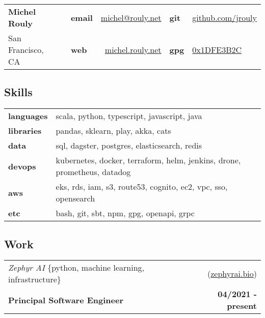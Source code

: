 \documentclass[10pt,letterpaper]{article}
\begin{document}
\setcounter{secnumdepth}{0}

\noindent
\begin{tabularx}{\textwidth}{@{} l X lr lX @{}}
  {\Large\textbf{Michel Rouly}} & &
      \textbf{email} & \href{mailto:michel@rouly.net}{michel@rouly.net} &
      \textbf{git} & \href{https://github.com/jrouly}{github.com/jrouly} \\
  {San Francisco, CA} & &
      \textbf{web} & \href{https://michel.rouly.net}{michel.rouly.net} &
      \textbf{gpg} & \href{https://keyserver.ubuntu.com/pks/lookup?search=0x1DFE3B2C\&fingerprint=on\&op=index}{0x1DFE3B2C} \\
\end{tabularx}

\subsection{Skills}

\noindent
\begin{tabularx}{\textwidth}{@{} lX @{}}
  \textbf{languages} & scala, python, typescript, javascript, java \\
  \textbf{libraries} & pandas, sklearn, play, akka, cats \\
  \textbf{data} & sql, dagster, postgres, elasticsearch, redis \\
  \textbf{devops} & kubernetes, docker, terraform, helm, jenkins, drone, prometheus, datadog \\
  \textbf{aws} & eks, rds, iam, s3, route53, cognito, ec2, vpc, sso, opensearch \\
  \textbf{etc} & bash, git, sbt, npm, gpg, openapi, grpc
\end{tabularx}

\subsection{Work}

\noindent\begin{tabularx}{\textwidth}{@{} Xr @{}}
  \textit{Zephyr AI} \{python, machine learning, infrastructure\} & (\href{https://zephyrai.bio}{zephyrai.bio}) \\
  \textbf{Principal Software Engineer} & \textbf{04/2021 - present} \\
\end{tabularx}
\end{document}
